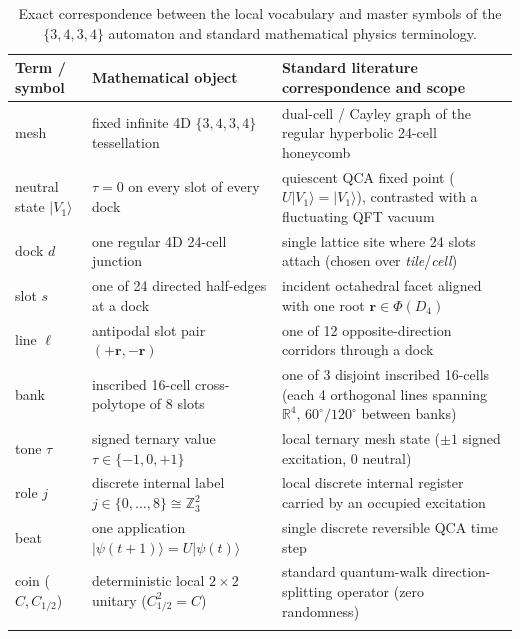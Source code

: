 \begin{table}[htbp]
\centering
\caption{Exact correspondence between the local vocabulary and master symbols of the $\{3,4,3,4\}$ automaton and
standard mathematical physics terminology.}
\label{tab:glossary}
\small
\begin{tabularx}{\textwidth}{@{}>{\raggedright\arraybackslash}p{3.0cm}>{\raggedright\arraybackslash\hsize=0.85\hsize}X>{\raggedright\arraybackslash\hsize=1.15\hsize}X@{}}
\toprule
Term / symbol & Mathematical object & Standard literature correspondence and scope \\
\midrule
mesh & fixed infinite 4D $\{3,4,3,4\}$ tessellation & dual-cell / Cayley graph of the regular hyperbolic 24-cell honeycomb \\
\addlinespace[4pt]
neutral state $|V_1\rangle$ & $\tau = 0$ on every slot of every dock & quiescent QCA fixed point ($U|V_1\rangle = |V_1\rangle$), contrasted with a fluctuating QFT vacuum \\
\addlinespace[4pt]
dock $d$ & one regular 4D 24-cell junction & single lattice site where 24 slots attach (chosen over \emph{tile}/\emph{cell}) \\
\addlinespace[4pt]
slot $s$ & one of 24 directed half-edges at a dock & incident octahedral facet aligned with one root $\mathbf{r} \in \Phi(D_4)$ \\
\addlinespace[4pt]
line $\ell$ & antipodal slot pair $(+\mathbf{r}, -\mathbf{r})$ & one of 12 opposite-direction corridors through a dock \\
\addlinespace[4pt]
bank & inscribed 16-cell cross-polytope of 8 slots & one of 3 disjoint inscribed 16-cells (each 4 orthogonal lines spanning $\mathbb{R}^4$, $60^\circ / 120^\circ$ between banks) \\
\addlinespace[4pt]
tone $\tau$ & signed ternary value $\tau \in \{-1, 0, +1\}$ & local ternary mesh state ($\pm 1$ signed excitation, $0$ neutral) \\
\addlinespace[4pt]
role $j$ & discrete internal label $j \in \{0, \ldots, 8\} \cong \mathbb{Z}_3^2$ & local discrete internal register carried by an occupied excitation \\
\addlinespace[4pt]
beat & one application $|\psi(t+1)\rangle = U|\psi(t)\rangle$ & single discrete reversible QCA time step \\
\addlinespace[4pt]
coin ($C, C_{1/2}$) & deterministic local $2 \times 2$ unitary ($C_{1/2}^2 = C$) & standard quantum-walk direction-splitting operator (zero randomness) \\
\addlinespace[4pt]

\end{tabularx}
\end{table}
